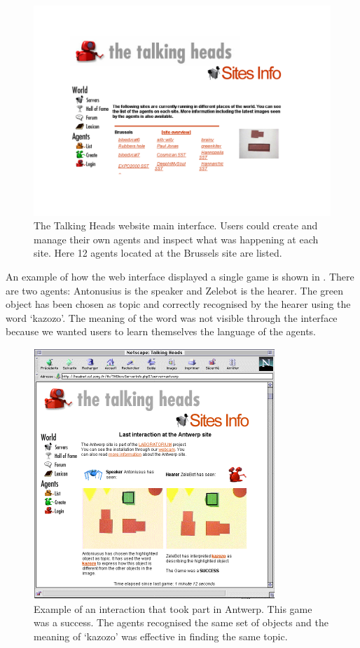 \begin{figure}[htb]
  \centerline{\includegraphics[width=.85\textwidth]{chap8/figures/th-website.pdf}}
\caption{\label{fig:thwebsite}The Talking Heads website main interface. Users could create and manage their own agents and inspect what was happening 
at each site. Here 12 agents located at the Brussels site are listed.}
\end{figure}

An example of how the web interface displayed a single game is shown in . 
There are two agents: Antonusius is the speaker and Zelebot is the hearer. 
The green object has been chosen as topic and correctly 
recognised by the hearer using the word `kazozo'. The meaning of the word was not visible through the interface because we 
wanted users to learn themselves the language of the agents. 


\begin{figure}[htb]
  \centerline{\includegraphics[width=.85\textwidth]{chap8/figures/zelebot.pdf}}
\caption{\label{fig:thwebsite-agent}Example of an interaction that took part in Antwerp. This game was a success. The agents recognised the same
set of objects and the meaning of `kazozo' was effective in finding the same topic. 
}
\end{figure}

